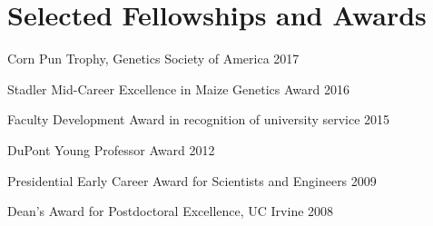 \documentclass[letterpaper,10pt]{article}
\renewenvironment{itemize}{
  \begin{list}{}{
    \setlength{\leftmargin}{1.5em}
  }
}{
  \end{list}
}
\begin{document}
\section*{Selected Fellowships and Awards}
\setlength\itemsep{0ex}
\begin {itemize}
\setlength\itemsep{0ex}
\item Corn Pun Trophy, Genetics Society of America 2017
\item Stadler Mid-Career Excellence in Maize Genetics Award 2016
\item Faculty Development Award in recognition of university service 2015
\item DuPont Young Professor Award 2012
\item Presidential Early Career Award for Scientists and Engineers 2009
\item Dean's Award for Postdoctoral Excellence, UC Irvine 2008
\end{itemize}

\end{document}
